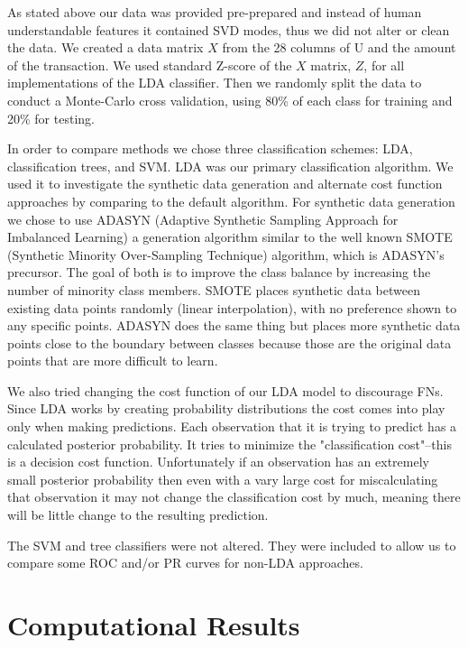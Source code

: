 \documentclass{article}
\begin{document}
As stated above our data was provided pre-prepared and instead of human understandable features it contained SVD modes, thus we did not alter or clean the data.
We created a  data matrix $X$ from the 28 columns of U and the amount of the transaction.
We used standard Z-score of the $X$ matrix, $Z$, for all implementations of the LDA classifier.
Then we randomly split the data to conduct a Monte-Carlo cross validation, using 80\% of each class for training and 20\% for testing.

In order to compare methods we chose three classification schemes: LDA, classification trees, and SVM. LDA was our primary classification algorithm. We used it to investigate the synthetic data generation and alternate cost function approaches by comparing to the default algorithm.
For synthetic data generation we chose to use ADASYN (Adaptive Synthetic Sampling Approach for Imbalanced Learning) a generation algorithm similar to the well known SMOTE (Synthetic Minority Over-Sampling Technique) algorithm, which is ADASYN's precursor.
The goal of both is to improve the class balance by increasing the number of minority class members.
SMOTE places synthetic data between existing data points randomly (linear interpolation), with no preference shown to any specific points.
ADASYN does the same thing but places more synthetic data points close to the boundary between classes because those are the original data points that are more difficult to learn.

We also tried changing the cost function of our LDA model to discourage FNs.
Since LDA works by creating probability distributions the cost comes into play only when making predictions.
Each observation that it is trying to predict has a calculated posterior probability.
It tries to minimize the "classification cost"--this is a decision cost function.
Unfortunately if an observation has an extremely small posterior probability then even with a vary large cost for miscalculating that observation it may not change the classification cost by much, meaning there will be little change to the resulting prediction.

The SVM and tree classifiers were not altered. They were included to allow us to compare some ROC and/or PR curves for non-LDA approaches.

\section{Computational Results}
\end{document}
